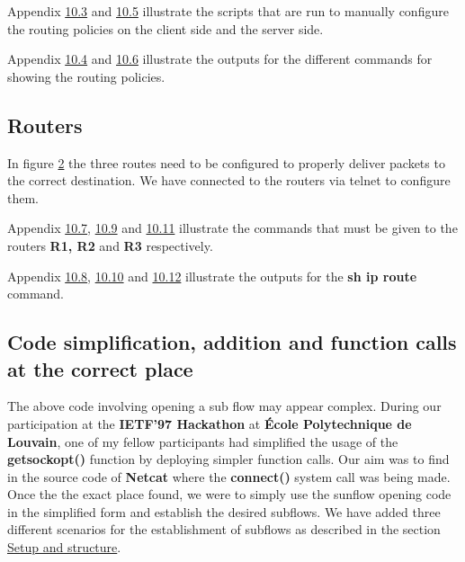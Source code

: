 \documentclass[a4paper,11pt]{article}
\begin{document}
			Appendix \hyperref[subsec:clientroute]{10.3} and \hyperref[subsec:serverroute]{10.5} illustrate the scripts that are run to manually configure the routing policies on the client side and the server side.

			Appendix \hyperref[subsec:clientrouteout]{10.4} and \hyperref[subsec:serverrouteout]{10.6} illustrate the outputs for the different commands for showing the routing policies.

			\subsection{Routers}
			\label{subsec:router}
			In figure \hyperref[fig:topology]{2} the three routes need to be configured to properly deliver packets to the correct destination.
			We have connected to the routers via telnet to configure them.

			Appendix \hyperref[subsec:routerconf1]{10.7}, \hyperref[subsec:routerconf2]{10.9} and \hyperref[subsec:routerconf3]{10.11} illustrate the commands that must be given to the routers \textbf{R1, R2} and \textbf{R3} respectively.


			Appendix \hyperref[subsec:routerconfout1]{10.8}, \hyperref[subsec:routerconfout2]{10.10} and \hyperref[subsec:routerconfout3]{10.12} illustrate the outputs for the \textbf{sh ip route} command.

		\subsection{Code simplification, addition and function calls at the correct place}
			\label{subsec:codesimplify}
			The above code involving opening a sub flow may appear complex. During our participation at the \textbf{IETF'97 Hackathon} at \textbf{École Polytechnique de Louvain}, one of my fellow participants had simplified the usage of the \textbf{getsockopt()} function by deploying simpler function calls. Our aim was to find in the source code of \textbf{Netcat} where the \textbf{connect()} system call was being made. Once the the exact place found, we were to simply use the sunflow opening code in the simplified form and establish the desired subflows. We have added three different scenarios for the establishment of subflows as described in the section \hyperref[subsec:setup]{Setup and structure}.
\end{document}
